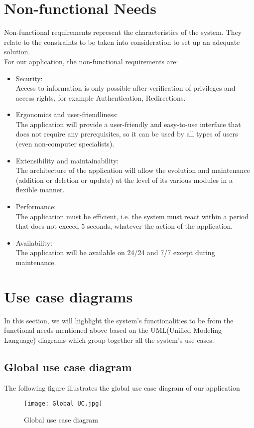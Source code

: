\section{Non-functional Needs}
Non-functional requirements represent the characteristics of the system.
They relate to the constraints to be taken into consideration to set up
an adequate solution.\\
For our application, the non-functional requirements are:
\begin{itemize}
\item Security:\\
Access to information is only possible after verification of privileges and access rights,
for example Authentication, Redirections.

\item Ergonomics and user-friendliness:\\
The application will provide a user-friendly and easy-to-use interface that does not
require any prerequisites, so it can be used by all types of users (even non-computer specialists).

\item Extensibility and maintainability:\\
The architecture of the application will allow the evolution and maintenance (addition
or deletion or update) at the level of its various modules in a flexible manner.

\item Performance:\\
The application must be efficient, i.e. the system must react within a period that does
not exceed 5 seconds, whatever the action of the application.

\item Availability:\\
The application will be available on 24/24 and 7/7 except during maintenance.

\end{itemize}
\section{Use case diagrams}
In this section, we will highlight the system's functionalities to be
from the functional needs mentioned above based on the UML(Unified Modeling Language) diagrams which group together all the system's use cases.
\subsection{Global use case diagram}
The following figure illustrates the global use case diagram of our application
\begin{figure}[H]%
    \center   
    \texttt{[image: Global UC.jpg]}
    \caption{Global use case diagram}
\end{figure}
